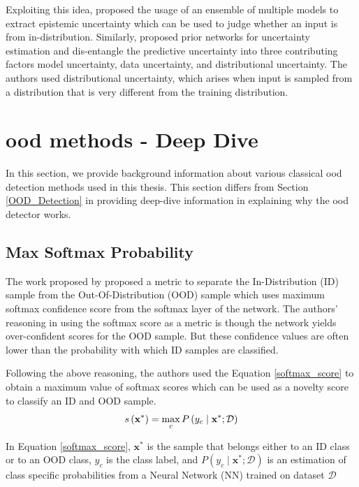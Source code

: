     Exploiting this idea, \citet{Lakshminarayanan2017} proposed the usage of an ensemble of multiple models to extract epistemic uncertainty which can be used to judge whether an input is from in-distribution. Similarly, \citet{Malinin2018} proposed prior networks for uncertainty estimation and dis-entangle the predictive uncertainty into three contributing factors model uncertainty, data uncertainty, and distributional uncertainty. The authors used distributional uncertainty, which arises when input is sampled from a distribution that is very different from the training distribution. 
    
    \section{\acrlong{ood} methods - Deep Dive}
    In this section, we provide background information about various classical \acrshort{ood} detection methods used in this thesis. This section differs from Section \ref{OOD_Detection} in providing deep-dive information in explaining why the \acrshort{ood} detector works.
    \subsection{Max Softmax Probability}
    The work proposed by \citet{hendrycks17baseline} proposed a metric to separate the In-Distribution (ID) sample from the Out-Of-Distribution (OOD) sample which uses maximum softmax confidence score from the softmax layer of the network. The authors' reasoning in using the softmax score as a metric is though the network yields over-confident scores for the OOD sample. But these confidence values are often lower than the probability with which ID samples are classified.
    
    Following the above reasoning, the authors used the Equation \ref{softmax_score} to obtain a maximum value of softmax scores which can be used as a novelty score to classify an ID and OOD sample.
    \begin{equation}
    \setlength{\jot}{10pt}
        s\left(\mathbf{x}^{*}\right)=\max _{c} P\left(y_{c} \mid \mathbf{x}^{*} ; \mathcal{D}\right)
        \label{softmax_score}
    \end{equation}
    
    In Equation \ref{softmax_score}, $\mathbf{x}^{*}$ is the sample that belongs either to an ID class or to an OOD class, $y_{c}$ is the class label, and $P\left(y_{c} \mid \mathbf{x}^{*} ; \mathcal{D}\right)$ is an estimation of class specific probabilities from a Neural Network (NN) trained on dataset $\mathcal{D}$
    
